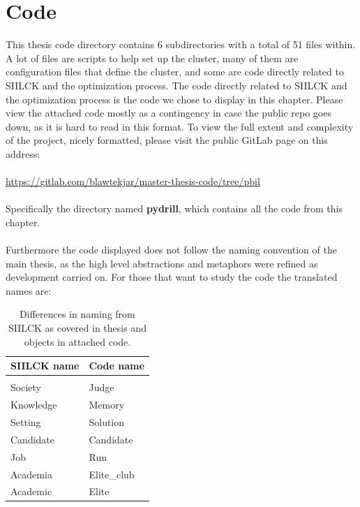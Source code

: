 \documentclass[a4paper,english]{report}
\begin{document}
\chapter{Code}
This thesis code directory contains 6 subdirectories with a total of 51 files within. A lot of files are scripts to help set up the cluster, many of them are configuration files that define the cluster, and some are code directly related to SIILCK and the optimization process. The code directly related to SIILCK and the optimization process is the code we chose to display in this chapter. Please view the attached code mostly as a contingency in case the public repo goes down, as it is hard to read in this format. To view the full extent and complexity of the project, nicely formatted, please visit the public GitLab page on this address:
\\
\\
\href{https://gitlab.com/blawtekjar/master-thesis-code/tree/pbil}{https://gitlab.com/blawtekjar/master-thesis-code/tree/pbil}
\\
\\
Specifically the directory named \textbf{pydrill}, which contains all the code from this chapter.
\\
\\
Furthermore the code displayed does not follow the naming convention of the main thesis, as the high level abstractions and metaphors were refined as development carried on. For those that want to study the code the translated names are:
\begin{table}[H]
	\centering
	\caption{Differences in naming from SIILCK as covered in thesis and objects in attached code.}
	\label{table:code_names}
	\begin{tabular}{ll}
		\\
		\multicolumn{1}{l}{\bfseries SIILCK name} & \multicolumn{1}{l}{\bfseries Code name} \\ \hline \\
		Society& Judge \\
		Knowledge & Memory \\
		Setting & Solution \\
		Candidate & Candidate \\
		Job & Run \\
		Academia & Elite\_club \\
		Academic & Elite \\
	\end{tabular}
\end{table}
\pagebreak
\end{document}
